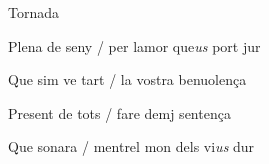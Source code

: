 \documentclass[12pt]{article}
\begin{document}
\begin{estrofaExtra}%




\begin{tornada}

Tornada

\end{tornada}


\end{estrofaExtra}


\begin{estrofa}

 Plena de seny / per lamor que\textit{us} port jur

 Que sim ve tart / la vostra benuolen\c{c}a

 Present de tots / fare demj senten\c{c}a

 Que sonara / mentrel mon dels vi\textit{us} dur

\end{estrofa}
\end{document}
